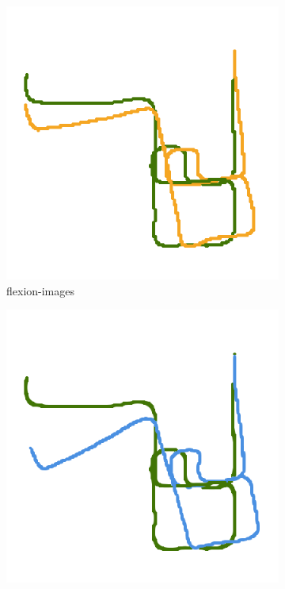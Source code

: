 \begin{figure}[htp]
\begin{subfigure}[c]{0.31\linewidth}
    \includegraphics[width=\linewidth]{chapter06/odo/jonas_flexion_AKAZE_nice.png}%
    \caption{\glspl{flexion-image}}
\end{subfigure}%
\begin{subfigure}[c]{0.31\linewidth}
    \includegraphics[width=\linewidth]{chapter06/odo/jonas_bearing_AKAZE_nice.png}%

\end{subfigure}
\end{figure}
